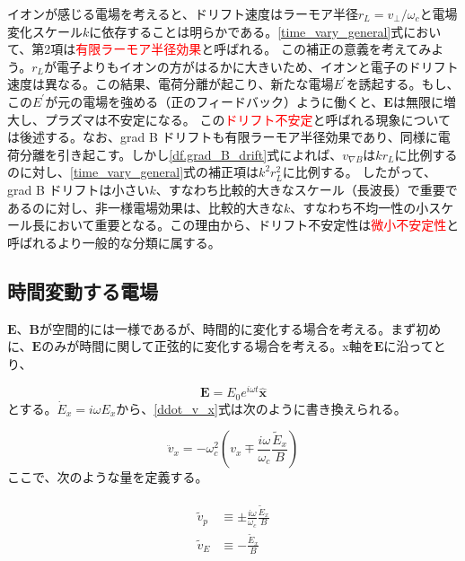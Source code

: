 \documentclass{ltjsarticle}
\numberwithin{equation}{section} %
\begin{document}
イオンが感じる電場を考えると、ドリフト速度はラーモア半径$r_L=v_\perp/\omega_c$と電場変化スケール$k$に依存することは明らかである。\eqref{time_vary_general}式において、第2項は\textcolor{red}{有限ラーモア半径効果}と呼ばれる。 
この補正の意義を考えてみよう。$r_L$が電子よりもイオンの方がはるかに大きいため、イオンと電子のドリフト速度は異なる。この結果、電荷分離が起こり、新たな電場$E^\prime$を誘起する。もし、この$E^\prime$が元の電場を強める（正のフィードバック）ように働くと、$\bm{E}$は無限に増大し、プラズマは不安定になる。
この\textcolor{red}{ドリフト不安定}と呼ばれる現象については後述する。なお、grad B ドリフトも有限ラーモア半径効果であり、同様に電荷分離を引き起こす。しかし\eqref{df.grad_B_drift}式によれば、$v_{\nabla B}$は$kr_L$に比例するのに対し、\eqref{time_vary_general}式の補正項は$k^2r_L^2$に比例する。
したがって、grad B ドリフトは小さい$k$、すなわち比較的大きなスケール（長波長）で重要であるのに対し、非一様電場効果は、比較的大きな$k$、すなわち不均一性の小スケール長において重要となる。この理由から、ドリフト不安定性は\textcolor{red}{微小不安定性}と呼ばれるより一般的な分類に属する。

\subsection{時間変動する電場}
$\bm{E}$、$\bm{B}$が空間的には一様であるが、時間的に変化する場合を考える。まず初めに、$\bm{E}$のみが時間に関して正弦的に変化する場合を考える。x軸を$\bm{E}$に沿ってとり、

\begin{equation}
  \bm{E} = E_0 e^{i\omega t}\hat{\bm{x}}
\end{equation}
とする。$\dot{E}_x = i\omega E_x$から、\eqref{ddot_v_x}式は次のように書き換えられる。

\begin{equation}
  \ddot{v}_x =-\omega_c ^2\left(v_x \mp \frac{i\omega}{\omega_c}\frac{\tilde{E}_x}{B}\right)
\end{equation}
ここで、次のような量を定義する。

\begin{align}
  \begin{split}
    \tilde{v}_p &\equiv \pm \frac{i\omega}{\omega_c}\frac{\tilde{E}_x}{B}\\
    \tilde{v}_E &\equiv -\frac{\tilde{E}_x}{B}  
  \end{split}
\end{align}
\end{document}
